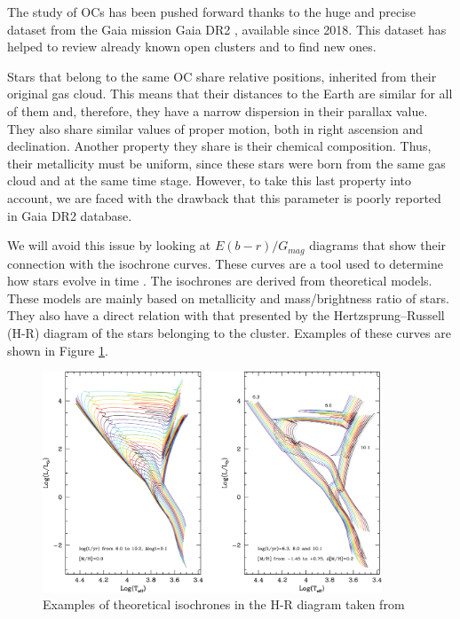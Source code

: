 \documentclass[11pt, a4paper, english]{book}
\begin{document}
The study of OCs has been pushed forward thanks to the huge and precise dataset from the Gaia mission
\cite{collaboration2016description} Gaia DR2 \cite{gaia2018gaia}, available since 2018.
This dataset has helped to review already known open clusters and to find new ones.

Stars that belong to the same OC share relative positions, inherited from their original gas cloud.
This means that their distances to the Earth are similar for all of them and, therefore, they have a narrow dispersion in their parallax value.
They also share similar values of proper motion, both in right ascension and declination.
Another property they share is their chemical composition.
Thus, their metallicity must be uniform, since these stars were born from the same gas cloud and at the same time stage.
However, to take this last property into account, we are faced with the drawback that this parameter is poorly reported in Gaia DR2 database.

We will avoid this issue by looking at $E(b-r) / G_{mag}$ diagrams that show their connection with the isochrone curves.
These curves are a tool used to determine how stars evolve in time \cite{bressan2012parsec}.
The isochrones are derived from theoretical models.
These models are mainly based on metallicity and mass/brightness ratio of stars.
They also have a direct relation with that presented by the Hertzsprung–Russell (H-R) diagram of the stars belonging to the cluster.
Examples of these curves are shown in Figure \ref{fig:examples_of_isochrones}.

\begin{figure}[htbp]
  \centering
  \includegraphics[width=0.9\textwidth]{../figures/theoretical_isochrones_in_hr_diagrams.pdf}
  \caption{Examples of theoretical isochrones in the H-R diagram taken from \protect{}}
  \label{fig:examples_of_isochrones}
\end{figure}
\end{document}
